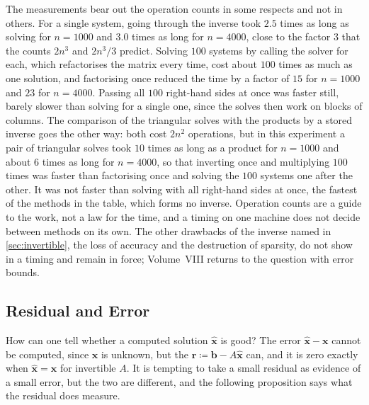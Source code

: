 The measurements bear out the operation counts in some respects and not in others. For a single system, going through the inverse took $2.5$ times as long as solving for $n=1000$ and $3.0$ times as long for $n=4000$, close to the factor $3$ that the counts $2n^3$ and $2n^3/3$ predict. Solving $100$ systems by calling the solver for each, which refactorises the matrix every time, cost about $100$ times as much as one solution, and factorising once reduced the time by a factor of $15$ for $n=1000$ and $23$ for $n=4000$. Passing all $100$ right-hand sides at once was faster still, barely slower than solving for a single one, since the solves then work on blocks of columns. The comparison of the triangular solves with the products by a stored inverse goes the other way: both cost $2n^2$ operations, but in this experiment a pair of triangular solves took $10$ times as long as a product for $n=1000$ and about $6$ times as long for $n=4000$, so that inverting once and multiplying $100$ times was faster than factorising once and solving the $100$ systems one after the other. It was not faster than solving with all right-hand sides at once, the fastest of the methods in the table, which forms no inverse. Operation counts are a guide to the work, not a law for the time, and a timing on one machine does not decide between methods on its own. The other drawbacks of the inverse named in \cref{sec:invertible}, the loss of accuracy and the destruction of sparsity, do not show in a timing and remain in force; Volume~VIII returns to the question with error bounds.

\subsection{Residual and Error}

How can one tell whether a computed solution $\hat{\mathbf x}$ is good? The error $\hat{\mathbf x}-\mathbf x$ cannot be computed, since $\mathbf x$ is unknown, but the  $\mathbf r\coloneqq\mathbf b-A\hat{\mathbf x}$ can, and it is zero exactly when $\hat{\mathbf x}=\mathbf x$ for invertible $A$. It is tempting to take a small residual as evidence of a small error, but the two are different, and the following proposition says what the residual does measure.


